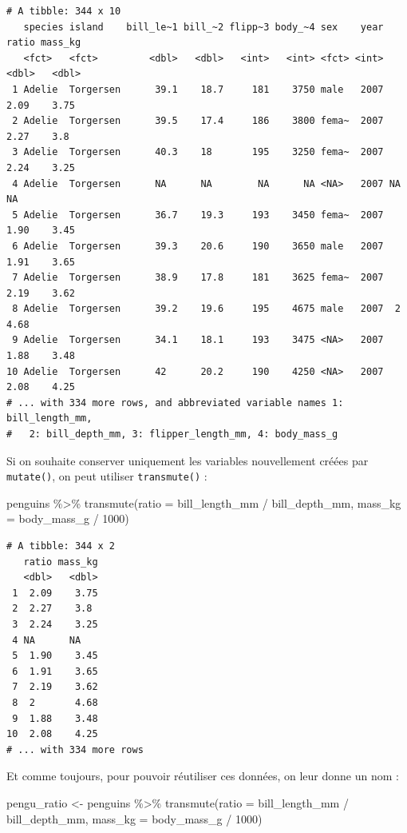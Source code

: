 \documentclass[
  letterpaper,
  DIV=11,
  numbers=noendperiod]{scrreprt}
\newenvironment{Shaded}{\begin{snugshade}}{\end{snugshade}}
\newcommand{\AttributeTok}[1]{\textcolor[rgb]{0.40,0.45,0.13}{#1}}
\newcommand{\DecValTok}[1]{\textcolor[rgb]{0.68,0.00,0.00}{#1}}
\newcommand{\FunctionTok}[1]{\textcolor[rgb]{0.28,0.35,0.67}{#1}}
\newcommand{\NormalTok}[1]{\textcolor[rgb]{0.00,0.23,0.31}{#1}}
\newcommand{\OtherTok}[1]{\textcolor[rgb]{0.00,0.23,0.31}{#1}}
\newcommand{\SpecialCharTok}[1]{\textcolor[rgb]{0.37,0.37,0.37}{#1}}
\begin{document}
\begin{verbatim}
# A tibble: 344 x 10
   species island    bill_le~1 bill_~2 flipp~3 body_~4 sex    year ratio mass_kg
   <fct>   <fct>         <dbl>   <dbl>   <int>   <int> <fct> <int> <dbl>   <dbl>
 1 Adelie  Torgersen      39.1    18.7     181    3750 male   2007  2.09    3.75
 2 Adelie  Torgersen      39.5    17.4     186    3800 fema~  2007  2.27    3.8 
 3 Adelie  Torgersen      40.3    18       195    3250 fema~  2007  2.24    3.25
 4 Adelie  Torgersen      NA      NA        NA      NA <NA>   2007 NA      NA   
 5 Adelie  Torgersen      36.7    19.3     193    3450 fema~  2007  1.90    3.45
 6 Adelie  Torgersen      39.3    20.6     190    3650 male   2007  1.91    3.65
 7 Adelie  Torgersen      38.9    17.8     181    3625 fema~  2007  2.19    3.62
 8 Adelie  Torgersen      39.2    19.6     195    4675 male   2007  2       4.68
 9 Adelie  Torgersen      34.1    18.1     193    3475 <NA>   2007  1.88    3.48
10 Adelie  Torgersen      42      20.2     190    4250 <NA>   2007  2.08    4.25
# ... with 334 more rows, and abbreviated variable names 1: bill_length_mm,
#   2: bill_depth_mm, 3: flipper_length_mm, 4: body_mass_g
\end{verbatim}

Si on souhaite conserver uniquement les variables nouvellement créées
par \texttt{mutate()}, on peut utiliser \texttt{transmute()} :

\begin{Shaded}
\begin{Highlighting}[]
\NormalTok{penguins }\SpecialCharTok{\%\textgreater{}\%}
  \FunctionTok{transmute}\NormalTok{(}\AttributeTok{ratio =}\NormalTok{ bill\_length\_mm }\SpecialCharTok{/}\NormalTok{ bill\_depth\_mm,}
            \AttributeTok{mass\_kg =}\NormalTok{ body\_mass\_g }\SpecialCharTok{/} \DecValTok{1000}\NormalTok{)}
\end{Highlighting}
\end{Shaded}

\begin{verbatim}
# A tibble: 344 x 2
   ratio mass_kg
   <dbl>   <dbl>
 1  2.09    3.75
 2  2.27    3.8 
 3  2.24    3.25
 4 NA      NA   
 5  1.90    3.45
 6  1.91    3.65
 7  2.19    3.62
 8  2       4.68
 9  1.88    3.48
10  2.08    4.25
# ... with 334 more rows
\end{verbatim}

Et comme toujours, pour pouvoir réutiliser ces données, on leur donne un
nom :

\begin{Shaded}
\begin{Highlighting}[]
\NormalTok{pengu\_ratio }\OtherTok{\textless{}{-}}\NormalTok{  penguins }\SpecialCharTok{\%\textgreater{}\%}
  \FunctionTok{transmute}\NormalTok{(}\AttributeTok{ratio =}\NormalTok{ bill\_length\_mm }\SpecialCharTok{/}\NormalTok{ bill\_depth\_mm,}
            \AttributeTok{mass\_kg =}\NormalTok{ body\_mass\_g }\SpecialCharTok{/} \DecValTok{1000}\NormalTok{)}
\end{Highlighting}
\end{Shaded}
\end{document}
